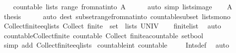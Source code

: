 \begin{isabellebody}
\ \ \isamarkupfalse%
\ {\isachardoublequoteopen}countable\ {\isacharparenleft}lists\ {\isacharparenleft}range\ {\isacharparenleft}from{\isacharunderscore}nat{\isacharunderscore}into\ A{\isacharparenright}{\isacharparenright}{\isacharparenright}{\isachardoublequoteclose}\isanewline
\ \ \ \ \isamarkupfalse%
\ {\isacharparenleft}auto\ simp{\isacharcolon}\ lists{\isacharunderscore}image{\isacharparenright}\isanewline
\ \ \isamarkupfalse%
\ A\ \isamarkupfalse%
\ {\isacharquery}thesis\isanewline
\ \ \ \ \isamarkupfalse%
\ {\isacharparenleft}auto\ dest{\isacharcolon}\ subset{\isacharunderscore}range{\isacharunderscore}from{\isacharunderscore}nat{\isacharunderscore}into\ countable{\isacharunderscore}subset\ lists{\isacharunderscore}mono{\isacharparenright}\isanewline
{}\isamarkupfalse%
%
\endisatagproof
{\isafoldproof}%
%
\isadelimproof
\isanewline
%
\endisadelimproof
\isanewline
{}\isamarkupfalse%
\ Collect{\isacharunderscore}finite{\isacharunderscore}eq{\isacharunderscore}lists{\isacharcolon}\ {\isachardoublequoteopen}Collect\ finite\ {\isacharequal}\ set\ {\isacharbackquote}\ lists\ UNIV{\isachardoublequoteclose}\isanewline
%
\isadelimproof
\ \ %
\endisadelimproof
%
\isatagproof
{}\isamarkupfalse%
\ finite{\isacharunderscore}list\ \isamarkupfalse%
\ auto%
\endisatagproof
{\isafoldproof}%
%
\isadelimproof
\isanewline
%
\endisadelimproof
\isanewline
{}\isamarkupfalse%
\ countable{\isacharunderscore}Collect{\isacharunderscore}finite{\isacharcolon}\ {\isachardoublequoteopen}countable\ {\isacharparenleft}Collect\ {\isacharparenleft}finite{\isacharcolon}{\isacharcolon}{\isacharprime}a{\isacharcolon}{\isacharcolon}countable\ set{\isasymRightarrow}bool{\isacharparenright}{\isacharparenright}{\isachardoublequoteclose}\isanewline
%
\isadelimproof
\ \ %
\endisadelimproof
%
\isatagproof
{}\isamarkupfalse%
\ {\isacharparenleft}simp\ add{\isacharcolon}\ Collect{\isacharunderscore}finite{\isacharunderscore}eq{\isacharunderscore}lists{\isacharparenright}%
\endisatagproof
{\isafoldproof}%
%
\isadelimproof
\isanewline
%
\endisadelimproof
\isanewline
{}\isamarkupfalse%
\ countable{\isacharunderscore}int{\isacharcolon}\ {\isachardoublequoteopen}countable\ {\isasymint}{\isachardoublequoteclose}\isanewline
%
\isadelimproof
\ \ %
\endisadelimproof
%
\isatagproof
{}\isamarkupfalse%
\ Ints{\isacharunderscore}def\ \isamarkupfalse%
\ auto%
\endisatagproof
{\isafoldproof}%

\end{isabellebody}
